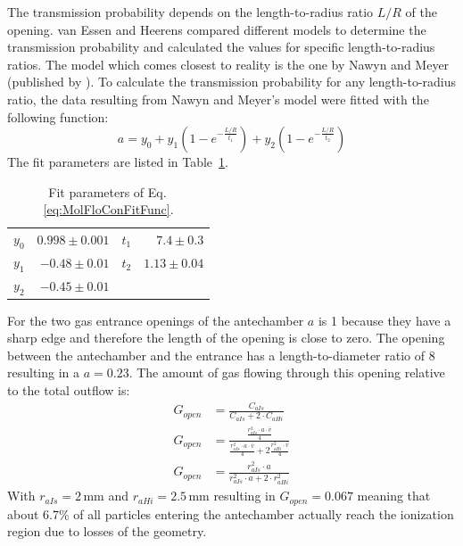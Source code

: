 	The transmission probability depends on the length-to-radius ratio $L/R$ of the opening. van Essen and Heerens \cite{molFlowTubeTransm_Essen1976} compared different models to determine the transmission probability and calculated the values for specific length-to-radius ratios. The model which comes closest to reality is the one by Nawyn and Meyer (published by \cite{molFlowTubeTransm_Essen1976}). To calculate the transmission probability for any length-to-radius ratio, the data resulting from Nawyn and Meyer's model were fitted with the following function:
	\begin{equation}
		a = y_0 + y_1\left(1-e^{-\frac{L/R}{t_1}}\right) + y_2\left(1-e^{-\frac{L/R}{t_2}}\right)
		\label{eq:MolFloConFitFunc}
	\end{equation}
	The fit parameters are listed in Table~\ref{tab:thMolFloConFiPara}.
	\begin{table}[h!]
		\begin{center}
			\begin{tabular}{l r| l r }
				$y_0$	& $0.998 \pm 0.001$ & $t_1$	& $7.4 \pm 0.3$	\\
				$y_1$	& $-0.48 \pm 0.01$ & $t_2$	& $1.13 \pm 0.04$ \\
				$y_2$ 	& $-0.45 \pm 0.01$	& &\\
			\end{tabular}
		\end{center}
		\caption{Fit parameters of Eq.\,\eqref{eq:MolFloConFitFunc}.}
		\label{tab:thMolFloConFiPara}
	\end{table}
	For the two gas entrance openings of the antechamber $a$ is 1 because they have a sharp edge and therefore the length of the opening is close to zero. The opening between the antechamber and the entrance has a length-to-diameter ratio of 8 resulting in a $a = 0.23$. The amount of gas flowing through this opening relative to the total outflow is:
	\begin{align}
		G_{open} & = \frac{C_{aIs}}{C_{aIs} + 2\cdot C_{aHi}} \label{eq:GAntOpen}\\
		G_{open} & = \frac{\frac{r_{aIs}^2\cdot a\cdot \bar{v}}{4}}{\frac{r_{aIs}^2\cdot a\cdot \bar{v}}{4} + 2\frac{r_{aHi}^2\cdot \bar{v}}{4}}\\
		G_{open} &= \frac{r_{aIs}^2\cdot a}{r_{aIs}^2\cdot a + 2\cdot r_{aHi}^2}
		\label{eq:geoOpenTube}
	\end{align}
	With $r_{aIs} = 2\,\si{\milli\meter}$ and $r_{aHi} = 2.5\,\si{\milli\meter}$ resulting in $G_{open} = 0.067$ meaning that about 6.7\% of all particles entering the antechamber actually reach the ionization region due to losses of the geometry.\\
